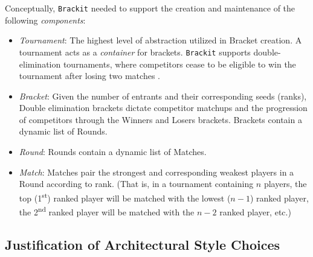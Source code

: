 \documentclass{article}
\begin{document}
Conceptually, \texttt{Brackit} needed to support the creation and maintenance of the following \textit{components}:
\begin{itemize}
    \item{\textit{Tournament}: The highest level of abstraction utilized in Bracket creation. A tournament acts as a \textit{container} for brackets. \texttt{Brackit} supports double-elimination tournaments, where competitors cease to be eligible to win the tournament after losing two matches \cite{wiki:det}.}
    \item{\textit{Bracket}: Given the number of entrants and their corresponding seeds (ranks), 
    Double elimination brackets dictate competitor matchups and the progression of competitors through the Winners and Losers brackets. 
    Brackets contain 
    a dynamic list of Rounds. }
    \item{\textit{Round}: Rounds contain a dynamic list of Matches.}
    \item{\textit{Match}: Matches pair the strongest and corresponding weakest players in a Round according to rank. (That is, in a tournament containing $n$ players, the top (1\textsuperscript{st}) ranked player will be matched with the lowest ($n-1$) ranked player, the 2\textsuperscript{nd} ranked player will be matched with the $n-2$ ranked player, etc.)}
\end{itemize}  
    
\subsection{Justification of Architectural Style Choices}
\end{document}
